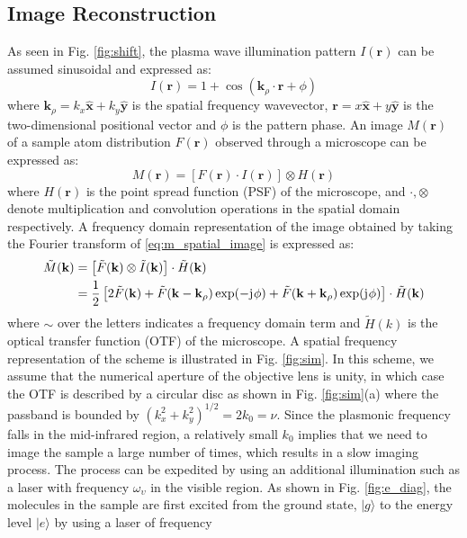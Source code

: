 \documentclass[10pt]{article}
\renewcommand{\v}[1]{\mathbf{#1}} %
\newcommand{\ti}[1]{\tilde{#1}} %
\renewcommand{\^}{\hat}  %
\renewcommand{\O}{\omega}  %
\newcommand{\p}{\rho}  %
\renewcommand{\^}{\hat}  %
\renewcommand{\j}{\mathrm{j}\mkern1mu} %
\begin{document}
\subsection{Image Reconstruction}
%
As seen in Fig. \ref{fig:shift}, the plasma wave illumination pattern $I(\v r)$ can be assumed sinusoidal and expressed as:
%
\begin{equation}
  I(\v r) = 1 + \cos(\v k_{\p} \cdot \v r + \phi)
  \label{eq:intensity}
\end{equation}
where $\v k_{\p} = k_x \v{\^{x}} + k_y \v{\^{y}}$ is the spatial frequency wavevector,  $\v r = x \v{\^{x}} +  y \v{\^{y}}$ is the two-dimensional positional vector and $\phi$ is the pattern phase. An image $M(\v r)$ of a sample atom distribution $F(\v r)$ observed through a microscope can be expressed as:
%
\begin{equation}
  M(\v r) = \left[ F(\v r) \cdot I(\v r) \right] \otimes H(\v r)
  \label{eq:m_spatial_image}
\end{equation}
%
where $H(\v r)$ is the point spread function (PSF) of the microscope, and $\cdot, \otimes$ denote multiplication and convolution operations in the spatial domain respectively. A frequency domain representation of the image obtained by taking the Fourier transform of \eqref{eq:m_spatial_image} is expressed as:
%
\begin{equation}
  \begin{split}
    \ti M(\v k) &= \left[ \ti F(\v k) \otimes \ti I(\v k) \right] \cdot \ti H(\v k) \\
     &= \frac{1}{2} \left[ 2\ti F(\v k) + \ti F(\v k - \v k_{\p}) \exp(- \j \phi) + \ti F(\v k + \v k_{\p}) \exp( \j \phi) \right] \cdot \ti H(\v k)
  \end{split}
  \label{eq:m_ft}
\end{equation}
%
where $\sim$ over the letters indicates a frequency domain term and $\ti H(k)$ is the optical transfer function (OTF) of the microscope. A spatial frequency representation of the scheme is illustrated in Fig. \ref{fig:sim}. In this scheme, we assume that the numerical aperture of the objective lens is unity, in which case the OTF is described by a circular disc as shown in Fig. \ref{fig:sim}(a) where the passband is bounded by $(k_x^2 + k_y^2)^{1/2} = 2 k_{0} = \nu$. Since the plasmonic frequency falls in the mid-infrared region, a relatively small $k_0$ implies that we need to image the sample a large number of times, which results in a slow imaging process. The process can be expedited by using an additional illumination such as a laser with frequency $\O_{\upsilon}$ in the visible region. As shown in Fig. \ref{fig:e_diag}, the molecules in the sample are first excited from the ground state, $|g\rangle$ to the energy level $|e\rangle$ by using a laser of frequency
\end{document}
